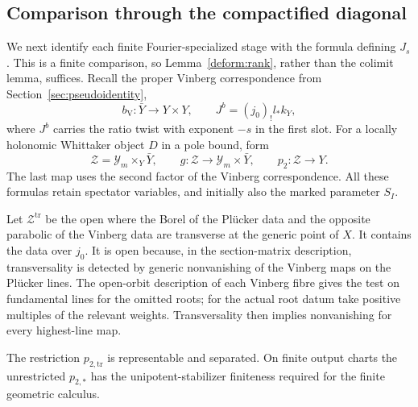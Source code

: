 \subsection{Comparison through the compactified diagonal}

We next identify each finite Fourier-specialized stage with
the formula defining $J_s$.  This is a finite comparison, so
Lemma~\ref{deform:rank}, rather than the colimit lemma, suffices.
Recall the proper Vinberg correspondence from
Section~\ref{sec:pseudoidentity},
\[
 b_{\mathrm V}:\bar Y\longrightarrow Y\times Y,
 \qquad J^b=(j_0)_!l_*k_Y,
\]
where $J^b$ carries the ratio twist with exponent $-s$ in the
first slot.  For a locally holonomic Whittaker object $D$ in
a pole bound, form
\[
 \mathscr Z=\mathcal Y_m\times_Y\bar Y,
 \qquad g:\mathscr Z\longrightarrow\mathcal Y_m\times\bar Y,
 \qquad p_2:\mathscr Z\longrightarrow Y.
\]
The last map uses the second factor of the Vinberg
correspondence.  All these formulas retain spectator
variables, and initially also the marked parameter $S_I$.

Let $\mathscr Z^{\mathrm{tr}}$ be the open where the Borel of
the Pl\"ucker data and the opposite parabolic of the Vinberg
data are transverse at the generic point of $X$.  It contains
the data over $j_0$.  It is open because, in the section-matrix
description, transversality is detected by generic
nonvanishing of the Vinberg maps on the Pl\"ucker lines.
The open-orbit description of each Vinberg fibre gives the
test on fundamental lines for the omitted roots; for the
actual root datum take positive multiples of the relevant
weights.  Transversality then implies nonvanishing for every
highest-line map.

\begin{lemma}\label{deform:transverse-map}
The restriction $p_{2,\mathrm{tr}}$ is representable and
separated.  On finite output charts the unrestricted
$p_{2,*}$ has the unipotent-stabilizer finiteness required for
the finite geometric calculus.
\end{lemma}

